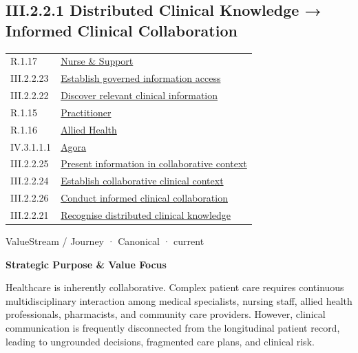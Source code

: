 \subsection*{III.2.2.1 Distributed Clinical Knowledge → Informed Clinical Collaboration}
\label{navigation:III.2.2.1}

\begin{longtable}{p{.22\linewidth}p{.73\linewidth}}
R.1.17 & \hyperref[element:2498df8f930747fba52ef1a77b710156]{Nurse \& Support} \\
III.2.2.23 & \hyperref[element:26719186d6444b5b80029fbf13ae7d06]{Establish governed information access} \\
III.2.2.22 & \hyperref[element:413213f085b44715a309f39b55ee3ee6]{Discover relevant clinical information} \\
R.1.15 & \hyperref[element:49480591b4554983aaa82a79c1568bf3]{Practitioner} \\
R.1.16 & \hyperref[element:a5880a0af54c4797818caba31b813d19]{Allied Health} \\
IV.3.1.1.1 & \hyperref[element:d1c4053e68384080b8eb79d2008632ba]{Agora} \\
III.2.2.25 & \hyperref[element:e0a57481d1d343d48abc3357053576bb]{Present information in collaborative context} \\
III.2.2.24 & \hyperref[element:e453905e7aef4db2aba07de5efc932bc]{Establish collaborative clinical context} \\
III.2.2.26 & \hyperref[element:e53b13570f1945829b753d8d7b427fda]{Conduct informed clinical collaboration} \\
III.2.2.21 & \hyperref[element:fc1b52968e944710b41b2a7c3fa53e5b]{Recognise distributed clinical knowledge} \\
\end{longtable}
\label{element:3ba98c0c1170458f8c02fa76694fee67}
{\small ValueStream / Journey · Canonical · current}\par

\par\medskip\textbf{Strategic Purpose \& Value Focus}\par


Healthcare is inherently collaborative. Complex patient care requires continuous multidisciplinary interaction among medical specialists, nursing staff, allied health professionals, pharmacists, and community care providers. However, clinical communication is frequently disconnected from the longitudinal patient record, leading to ungrounded decisions, fragmented care plans, and clinical risk.



